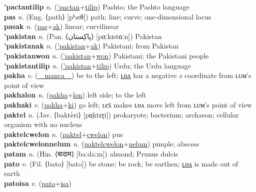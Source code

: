 \textbf{'pactantilip} \textit{n.} (\hyperref['pactan]{'pactan}+\hyperref[tilip]{tilip})
Pashto; the Pashto language \label{'pactantilip} \\
\textbf{pas} \textit{n.} (Eng. ⟨path⟩ [pʰæθ])
path; line; curve; one-dimensional locus \label{pas} \\
\textbf{pasak} \textit{n.} (\hyperref[pas]{pas}+\hyperref[ak]{ak})
linear; curvilinear \label{pasak} \\
\textbf{'pakistan} \textit{n.} (Pan. ⟨پاکِستان‎⟩ [pɑːkɪstɑːn])
Pakistan \label{'pakistan} \\
\textbf{'pakistanak} \textit{n.} (\hyperref['pakistan]{'pakistan}+\hyperref[ak]{ak})
Pakistani; from Pakistan \label{'pakistanak} \\
\textbf{'pakistanwon} \textit{n.} (\hyperref['pakistan]{'pakistan}+\hyperref[won]{won})
Pakistani; the Pakistani people \label{'pakistanwon} \\
\textbf{'pakistantilip} \textit{n.} (\hyperref['pakistan]{'pakistan}+\hyperref[tilip]{tilip})
Urdu; the Urdu language \label{'pakistantilip} \\
\textbf{pakha} \textit{v.} (\hyperref[manca]{~~manca~~})
be to the left; \hyperref[pakhalon]{ʟᴏᴧ} has a negative \textit{x} coordinate from ʟᴜᴍ’s point of view \label{pakha} \\
\textbf{pakhalon} \textit{n.} (\hyperref[pakha]{pakha}+\hyperref[lon]{lon})
left side; to the left \label{pakhalon} \\
\textbf{pakhaki} \textit{v.} (\hyperref[pakha]{pakha}+\hyperref[ki]{ki})
go left; ʟєꜱ makes ʟᴏᴧ move left from ʟᴜᴍ’s point of view \label{pakhaki} \\
\textbf{paktel} \textit{n.} (Jav. ⟨baktèri⟩ [pɑ̤ktɛɽi])
prokaryote; bacterium; archaeon; cellular organism with no nucleus \label{paktel} \\
\textbf{paktelcwelon} \textit{n.} (\hyperref[paktel]{paktel}+\hyperref[cwelon]{cwelon})
pus \label{paktelcwelon} \\
\textbf{paktelcwelonnelum} \textit{n.} (\hyperref[paktelcwelon]{paktelcwelon}+\hyperref[nelum]{nelum})
pimple; abscess \label{paktelcwelonnelum} \\
\textbf{patam} \textit{n.} (Hin. ⟨बादाम⟩ [baːdaːm])
almond; Prunus dulcis \label{patam} \\
\textbf{pato} \textit{v.} (Fil. ⟨bato⟩ [bato])
be stone; be rock; be earthen; \hyperref[patolon]{ʟᴏᴧ} is made out of earth \label{pato} \\
\textbf{patoisa} \textit{v.} (\hyperref[pato]{pato}+\hyperref[isa]{isa})
